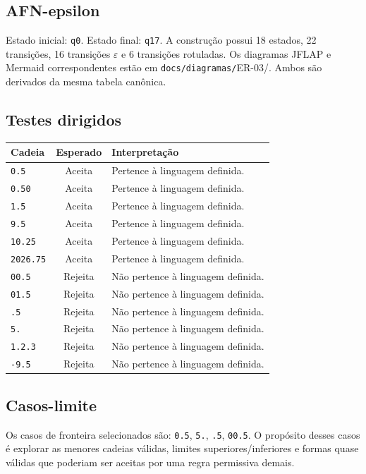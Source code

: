 \subsection{AFN-epsilon}
Estado inicial: \texttt{q0}. Estado final: \texttt{q17}. A construção possui 18 estados, 22 transições, 16 transições $\varepsilon$ e 6 transições rotuladas.
Os diagramas JFLAP e Mermaid correspondentes estão em \texttt{docs/diagramas/}ER-03/. Ambos são derivados da mesma tabela canônica.
\subsection{Testes dirigidos}
\begin{center}
\small
\begin{tabular}{|p{}|c|p{}|}
\toprule
Cadeia & Esperado & Interpretação \\
\midrule
\texttt{0.5} & Aceita & Pertence à linguagem definida. \\
\texttt{0.50} & Aceita & Pertence à linguagem definida. \\
\texttt{1.5} & Aceita & Pertence à linguagem definida. \\
\texttt{9.5} & Aceita & Pertence à linguagem definida. \\
\texttt{10.25} & Aceita & Pertence à linguagem definida. \\
\texttt{2026.75} & Aceita & Pertence à linguagem definida. \\
\texttt{00.5} & Rejeita & Não pertence à linguagem definida. \\
\texttt{01.5} & Rejeita & Não pertence à linguagem definida. \\
\texttt{.5} & Rejeita & Não pertence à linguagem definida. \\
\texttt{5.} & Rejeita & Não pertence à linguagem definida. \\
\texttt{1.2.3} & Rejeita & Não pertence à linguagem definida. \\
\texttt{-9.5} & Rejeita & Não pertence à linguagem definida. \\
\bottomrule
\end{tabular}
\end{center}
\subsection{Casos-limite}
Os casos de fronteira selecionados são: \texttt{0.5}, \texttt{5.}, \texttt{.5}, \texttt{00.5}.
\medskip
O propósito desses casos é explorar as menores cadeias válidas, limites superiores/inferiores e formas quase válidas que poderiam ser aceitas por uma regra permissiva demais.

